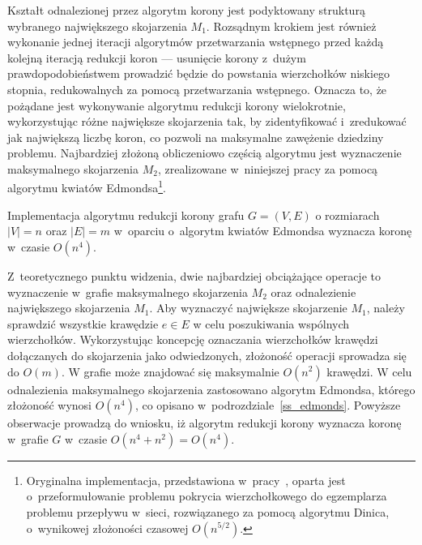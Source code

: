 \par{
  Kształt odnalezionej przez algorytm korony jest podyktowany strukturą wybranego największego skojarzenia $M_1$.
  Rozsądnym krokiem jest również wykonanie jednej iteracji algorytmów przetwarzania wstępnego przed każdą kolejną iteracją redukcji koron --- usunięcie korony z~dużym prawdopodobieństwem prowadzić będzie do powstania wierzchołków niskiego stopnia, redukowalnych za pomocą przetwarzania wstępnego.
  Oznacza to, że pożądane jest wykonywanie algorytmu redukcji korony wielokrotnie, wykorzystując różne największe skojarzenia tak, by zidentyfikować i~zredukować jak największą liczbę koron, co pozwoli na maksymalne zawężenie dziedziny problemu.
  Najbardziej złożoną obliczeniowo częścią algorytmu jest wyznaczenie maksymalnego skojarzenia $M_2$, zrealizowane w~niniejszej pracy za pomocą algorytmu kwiatów Edmondsa\footnote{
    Oryginalna implementacja, przedstawiona w~pracy~\cite{KernelizationAlgorithms04}, oparta jest o~przeformułowanie problemu pokrycia wierzchołkowego do egzemplarza problemu przepływu w~sieci, rozwiązanego za pomocą algorytmu Dinica, o~wynikowej złożoności czasowej $O(n^{5/2})$.
  }.
}
\begin{theorem}
  Implementacja algorytmu redukcji korony grafu $G=(V,E)$ o rozmiarach $|V|=n$ oraz $|E|=m$ w~oparciu o~algorytm kwiatów Edmondsa wyznacza koronę w~czasie $O(n^{4})$.
\end{theorem}
\begin{bproof}
  Z~teoretycznego punktu widzenia, dwie najbardziej obciążające operacje to wyznaczenie w~grafie maksymalnego skojarzenia $M_2$ oraz odnalezienie największego skojarzenia $M_1$.
  Aby wyznaczyć największe skojarzenie $M_1$, należy sprawdzić wszystkie krawędzie $e\in E$ w celu poszukiwania wspólnych wierzchołków.
  Wykorzystując koncepcję oznaczania wierzchołków krawędzi dołączanych do skojarzenia jako odwiedzonych, złożoność operacji sprowadza się do $O(m)$.
  W grafie może znajdować się maksymalnie $O(n^{2})$ krawędzi.
  W celu odnalezienia maksymalnego skojarzenia zastosowano algorytm Edmondsa, którego złożoność wynosi $O(n^{4})$, co opisano w~podrozdziale~\ref{ss_edmonds}.
  Powyższe obserwacje prowadzą do wniosku, iż algorytm redukcji korony wyznacza koronę w~grafie $G$ w~czasie $O(n^{4} + n^{2})=O(n^{4})$.
\end{bproof}
